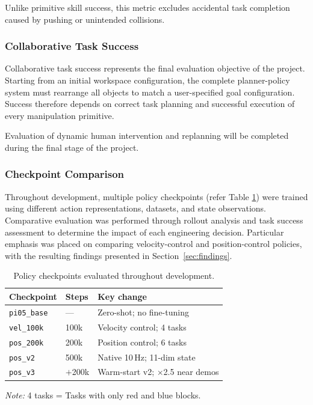 \documentclass[conference, 12pt]{IEEEtran}
\begin{document}
Unlike primitive skill success, this metric excludes accidental task completion caused by pushing or unintended collisions.

\subsubsection{Collaborative Task Success}
\label{sec:collab_metric}
Collaborative task success represents the final evaluation objective of the project. Starting from an initial workspace configuration, the complete planner-policy system must rearrange all objects to match a user-specified goal configuration. Success therefore depends on correct task planning and successful execution of every manipulation primitive.

Evaluation of dynamic human intervention and replanning will be completed during the final stage of the project.

\subsubsection{Checkpoint Comparison}

Throughout development, multiple policy checkpoints (refer Table \ref{tab:checkpoints}) were trained using different action representations, datasets, and state observations. Comparative evaluation was performed through rollout analysis and task success assessment to determine the impact of each engineering decision. Particular emphasis was placed on comparing velocity-control and position-control policies, with the resulting findings presented in Section~\ref{sec:findings}.

\begin{table}[t]
  \centering
  \caption{Policy checkpoints evaluated throughout development.}
  \label{tab:checkpoints}
  \small
  \setlength{\tabcolsep}{4pt}   %
  \begin{tabular}{lll}
  \toprule
  \textbf{Checkpoint} & \textbf{Steps}
  & \textbf{Key change} \\
  \midrule
  \texttt{pi05\_base}       & —      &
  Zero-shot; no fine-tuning \\
  \texttt{vel\_100k}         & 100k   &
  Velocity control; 4 tasks \\
  \texttt{pos\_200k}        & 200k   &
  Position control; 6 tasks \\
  \texttt{pos\_v2}    & 500k   &
  Native 10\,Hz; 11-dim state \\
  \texttt{pos\_v3}          & $+$200k &
  Warm-start v2; $\times$2.5 near
  demos \\
  \bottomrule
  \end{tabular}
  \vspace{5mm}
  \textit{Note:} 4 tasks = Tasks with only red and blue blocks.
  \end{table}
\end{document}
